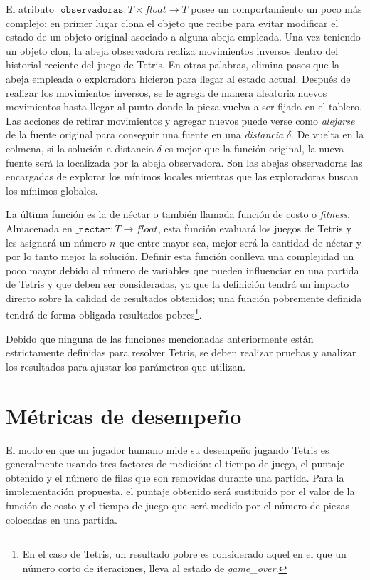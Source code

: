 El atributo $\texttt{\_observadoras}:T \times float \rightarrow T$ posee un comportamiento 
un poco más complejo: en primer lugar clona el objeto que recibe para evitar 
modificar el estado de un objeto original asociado a alguna abeja empleada. Una vez teniendo 
un objeto clon, la abeja observadora realiza 
movimientos inversos dentro del historial reciente del juego de Tetris. En otras 
palabras, elimina pasos que la abeja empleada o exploradora hicieron para llegar 
al estado actual. Después de realizar los movimientos inversos, se le agrega de manera 
aleatoria nuevos movimientos hasta llegar al punto donde la pieza vuelva a ser 
fijada en el tablero. Las acciones de retirar movimientos y agregar nuevos puede 
verse como \textit{alejarse} de la fuente original para conseguir una fuente 
en una \textit{distancia} $\delta$. De vuelta en la colmena, si la solución a 
distancia $\delta$ es mejor que la función original, la nueva fuente será la 
localizada por la abeja observadora. Son las abejas observadoras las encargadas 
de explorar los mínimos locales mientras que las exploradoras buscan los mínimos 
globales.

La última función es la de néctar o también llamada función de costo o 
\textit{fitness}. Almacenada en $\texttt{\_nectar}: T \rightarrow float$, esta 
función evaluará los juegos de Tetris y les asignará un número $n$ que entre mayor 
sea, mejor será la cantidad de néctar y por lo tanto mejor la solución. Definir esta 
función conlleva una complejidad un poco mayor debido al número de variables 
que pueden influenciar en una partida de Tetris y que deben 
ser consideradas, ya que la definición tendrá un impacto directo sobre 
la calidad de resultados obtenidos; una función pobremente definida tendrá 
de forma obligada resultados pobres\footnote{En el caso de Tetris, un resultado 
pobre es considerado aquel en el que un número corto de iteraciones, lleva al estado 
de \textit{game\_\!over}.}. 

Debido que ninguna de las funciones mencionadas anteriormente están estrictamente 
definidas para resolver Tetris, se deben realizar pruebas y analizar los 
resultados para ajustar los parámetros que utilizan. 


\section{Métricas de desempeño}

El modo en que un jugador humano mide su desempeño jugando Tetris es generalmente usando 
tres factores de medición: el tiempo de juego, el puntaje obtenido y el número de filas que 
son removidas durante una partida. Para la implementación propuesta, el puntaje 
obtenido será sustituido por el valor de la función de costo y el tiempo de 
juego que será medido por el número de piezas colocadas en una partida. 

